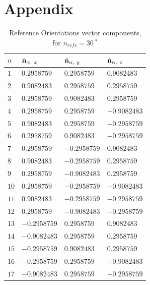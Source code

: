 \documentclass[12pt]{spieman}
\begin{document}
\newpage
\appendix
\onecolumn
\section*{Appendix}
\setcounter{table}{0}
\renewcommand{\thetable}{A\arabic{table}}
\begin{table}[h]
	\begin{center}
		\caption{\label{tab:A1}
		Reference Orientations vector components, for $n_{refs} = 30 \ ^*$}
		\begin{tabularx}{0.7\textwidth}{
				| >{\centering\arraybackslash}X
				| >{\centering\arraybackslash}X
				| >{\centering\arraybackslash}X
				| >{\centering\arraybackslash}X | }
			\hline\hline
			$\alpha$ & $\hat{\bf n}_{\alpha,\ x}$ &  $\hat{\bf n}_{\alpha,\ y}$ &  $\hat{\bf n}_{\alpha,\ z}$ 
			\\ \hline
			$1$ & $0.2958759$ & $0.2958759$ & $0.9082483$ \\
			$2$ & $0.9082483$ & $0.2958759$ & $0.2958759$ \\
			$3$ & $0.2958759$ & $0.9082483$ & $0.2958759$ \\
			$4$ & $0.2958759$ & $0.2958759$ & $-0.9082483$ \\
			$5$ & $0.9082483$ & $0.2958759$ & $-0.2958759$ \\
			$6$ & $0.2958759$ & $0.9082483$ & $-0.2958759$ \\
			$7$ & $0.2958759$ & $-0.2958759$ & $0.9082483$ \\
			$8$ & $0.9082483$ & $-0.2958759$ & $0.2958759$ \\
			$9$ & $0.2958759$ & $-0.9082483$ & $0.2958759$ \\
			$10$ & $0.2958759$ & $-0.2958759$ & $-0.9082483$ \\
			$11$ & $0.9082483$ & $-0.2958759$ & $-0.2958759$ \\
			$12$ & $0.2958759$ & $-0.9082483$ & $-0.2958759$ \\
			$13$ & $-0.2958759$ & $0.2958759$ & $0.9082483$ \\
			$14$ & $-0.9082483$ & $0.2958759$ & $0.2958759$ \\
			$15$ & $-0.2958759$ & $0.9082483$ & $0.2958759$ \\
			$16$ & $-0.2958759$ & $0.2958759$ & $-0.9082483$ \\
			$17$ & $-0.9082483$ & $0.2958759$ & $-0.2958759$ \\

\end{tabularx}
\end{center}
\end{table}
\end{document}

